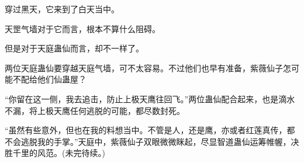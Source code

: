 \begin{this_body}
穿过黑天，它来到了白天当中。

天罡气墙对于它而言，根本不算什么阻碍。

但是对于天庭蛊仙而言，却不一样了。

两位天庭蛊仙要穿越天庭气墙，可不太容易。不过他们也早有准备，紫薇仙子怎可能不配给他们仙蛊屋？

“你留在这一侧，我去追击，防止上极天鹰往回飞。”两位蛊仙配合起来，也是滴水不漏，将上极天鹰任何逃脱的可能，都尽数封死。

“虽然有些意外，但也在我的料想当中。不管是人，还是鹰，亦或者红莲真传，都不会逃脱我的手掌。”天庭中，紫薇仙子双眼微微眯起，尽显智道蛊仙运筹帷幄，决胜千里的风范。(未完待续。)

\end{this_body}

